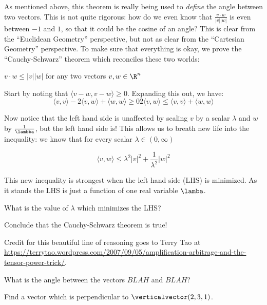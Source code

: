  As mentioned above, this theorem is really being used to \textit{define} the angle between two vectors.  This is not quite rigorous:  how do we even know that 
 $\frac{v \cdot w}{|v||w|}$ is even between $-1$ and $1$, so that it could be the cosine of an angle?  This is clear from the ``Euclidean Geometry'' perspective, 
 but not as clear from the ``Cartesian Geometry'' perspective.  To make sure that everything is okay, we prove the ``Cauchy-Schwarz'' theorem which reconciles these two
 worlds:
 
 \begin{theorem}
 	$v \cdot w \leq |v||w|$ for any two vectors $v,w \in \R^n$
 \end{theorem} 
 
\begin{question}
	Start by noting that $\langle v-w,v-w\rangle \geq 0 $.  Expanding this out, we have:
	\[
		\langle v,v \rangle - 2 \langle v,w \rangle +\langle  w,w\rangle \geq 0
		2\langle v,w \rangle \leq \langle v,v \rangle  + \langle w,w\rangle
	\]
	
	Now notice that the left hand side is unaffected by scaling $v$ by a scalar $\lambda$ and $w$ by $\frac{1}{\lambba}$, but the left hand side is!
	This allows us to breath new life into the inequality:  we know that for every scalar $\lambda \in (0,\infty)$ 
	
	\[
		\langle  v,w \rangle \leq \lambda^2 |v|^2 + \frac{1}{\lambda^2} |w|^2
	\] 
	
	This new inequality is strongest when the left hand side (LHS) is minimized.  As it stands the LHS is just a function of one real variable $\lamba$.
	
	What is the value of $\lambda$ which minimizes the LHS? 
	\begin{answer} \end{answer}
	
	Conclude that the Cauchy-Schwarz theorem is true!
	
	Credit for this beautiful line of reasoning goes to Terry Tao at \url{https://terrytao.wordpress.com/2007/09/05/amplification-arbitrage-and-the-tensor-power-trick/}.
	
\end{question}


 \begin{question}
 	What is the angle between the vectors $BLAH$  and $BLAH$?
 \end{question}
	 	
 	\begin{question}
 		Find a vector which is perpendicular to $\verticalvector(2,3,1)$.  
 	\end{question}
 	
